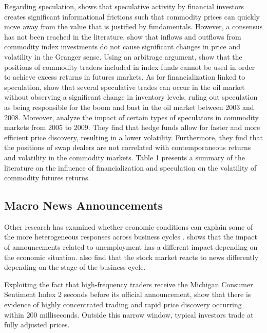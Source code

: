 \documentclass[12pt]{article}
\begin{document}
Regarding speculation, \citet{singleton2014investor} shows that speculative activity by financial investors creates significant informational frictions such that commodity prices can quickly move away from the value that is justified by fundamentals. 
However, a consensus has not been reached in the literature.  \citet{stoll2010commodity}  show that inflows and outflows from commodity index investments do not cause significant changes in price and volatility in the Granger sense. Using an arbitrage argument, \citet{hamilton2014risk} show that the positions of commodity traders included in index funds cannot be used in order to achieve excess returns in  futures markets. As for financialization linked to speculation,  \citet{kilian2014role}  show that several speculative trades can occur in the oil market without observing a significant change in inventory levels, ruling out speculation as being responsible for the boom and bust in the oil market between 2003 and 2008. Moreover,  \citet{brunetti2016speculators}  analyze the impact of certain types of speculators in commodity markets from 2005 to 2009. They find that hedge funds allow for faster and more efficient price discovery, resulting in a lower volatility. Furthermore, they find that the positions of swap dealers are not correlated with contemporaneous returns and volatility in the commodity markets.  Table 1 presents a summary of the literature on the influence of financialization and speculation on the volatility of commodity futures returns.

\subsection{Macro News Announcements}

Other research has examined whether economic conditions can explain some of the more heterogeneous responses across business cycles \citep{boyd2005stock,andersen2003micro}. \citet{boyd2005stock} shows that the impact of announcements related to unemployment has a different impact depending on the economic situation. \citet{andersen2003micro} also find that the stock market reacts to news differently depending on the stage of the business cycle.

Exploiting the fact that high-frequency traders receive the Michigan Consumer Sentiment Index 2 seconds before its official announcement, \citet{hu2017early} show that there is evidence of highly concentrated trading and rapid price discovery occurring within 200 milliseconds. Outside this narrow window, typical investors trade at fully adjusted prices. 
\end{document}
